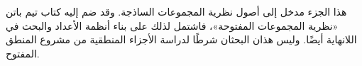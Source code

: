 \documentclass[../../include/open-logic-part]{subfiles}
\begin{document}

\begin{editorial}
  هذا الجزء مدخل إلى أصول نظرية المجموعات الساذجة. وقد ضم إليه كتاب
  تيم باتن «نظرية المجموعات المفتوحة»، فاشتمل لذلك على بناء أنظمة الأعداد
  والبحث في اللانهاية أيضًا. وليس هذان البحثان شرطًا لدراسة الأجزاء
  المنطقية من مشروع المنطق المفتوح.
\end{editorial}


\OLEndPartHook
\end{document}
